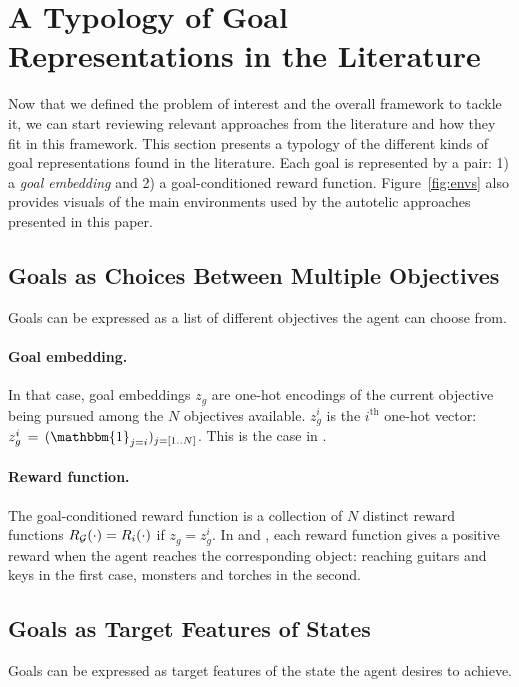 

\section{A Typology of Goal Representations in the Literature}
\label{sec:survey_goal_rep}

Now that we defined the problem of interest and the overall framework to tackle it, we can start reviewing relevant approaches from the literature and how they fit in this framework. This section presents a typology of the different kinds of goal representations found in the literature. Each goal is represented by a pair: 1) a \textit{goal embedding} and 2) a goal-conditioned reward function. Figure~\ref{fig:envs} also provides visuals of the main environments used by the autotelic approaches presented in this paper.

\subsection{Goals as Choices Between Multiple Objectives}
Goals can be expressed as a list of different objectives the agent can choose from.

\paragraph{Goal embedding.} In that case, goal embeddings $z_g$ are one-hot encodings of the current objective being pursued among the $N$ objectives available. $z_g^i$ is the $i^\text{th}$ one-hot vector: $z_g^i\,=\,(\mathbbm{1}_{j=i})_{j=[1..N]}$. This is the case in \cite{oh2017zero,mankowitz2018unicorn,codevilla2018end}.

\paragraph{Reward function.} The goal-conditioned reward function is a collection of $N$ distinct reward functions $R_{\mathcal{G}}(\cdot)=R_i(\cdot)$ if $z_g=z_g^i$. In \cite{mankowitz2018unicorn} and \cite{chan2019actrce}, each reward function gives a positive reward when the agent reaches the corresponding object: reaching guitars and keys in the first case, monsters and torches in the second.

\subsection{Goals as Target Features of States}
Goals can be expressed as target features of the state the agent desires to achieve.

